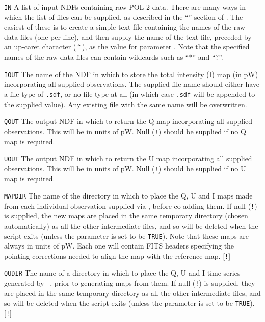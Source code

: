 \begin{aligndesc}
\item[\texttt{IN}] A list of input NDFs containing raw POL-2 data.
  There are many ways in which the list of files can be supplied, as
  described in the ``'' section of . The
  easiest of these is to create a simple text file containing the names of the
  raw data files (one per line), and then supply the name of the
  text file, preceded by an up-caret character (\,\texttt{\^{}}\,), as
  the value for parameter . Note that the specified names of the raw
  data files can contain wildcards such as ``$*$'' and ``?''.

\item[\texttt{IOUT}] The name of the NDF in which to store the
  total intensity (I) map (in pW) incorporating all supplied observations.
  The supplied file name should either have a file type of
  \texttt{.sdf}, or no file type at all (in which case
  \texttt{.sdf} will be appended to the supplied value). Any existing
  file with the same name will be overwritten.

\item[\texttt{QOUT}] The output NDF in which to return the Q map
  incorporating all supplied observations. This will be in units of
  pW. Null (\texttt{!}) should be supplied if no Q map is required.

\item[\texttt{UOUT}] The output NDF in which to return the U map
  incorporating all supplied observations. This will be in units of
  pW. Null (\texttt{!}) should be supplied if no U map is required.

\item[\texttt{MAPDIR}] The name of the directory in which to place the Q,
  U and I maps made from each individual observation supplied via
  , before co-adding them. If null (\texttt{!}) is supplied, the new
  maps are placed in the same temporary directory (chosen automatically)
  as all the other intermediate files, and so will be deleted when the script
  exits (unless the parameter  is set to be \texttt{TRUE}). Note
  that these maps are always in units of pW. Each one will contain FITS
  headers specifying the pointing corrections needed to align the map with
  the reference map. [\texttt{!}]

\item[\texttt{QUDIR}] The name of a directory in which to place the Q, U
  and I time series generated by \SMURF\ , prior to generating
  maps from them. If null (\texttt{!}) is supplied, they are placed in the same
  temporary directory as all the other intermediate files, and so will
  be deleted when the script exits (unless the parameter  is
  set to be \texttt{TRUE}). [\texttt{!}]
\end{aligndesc}

